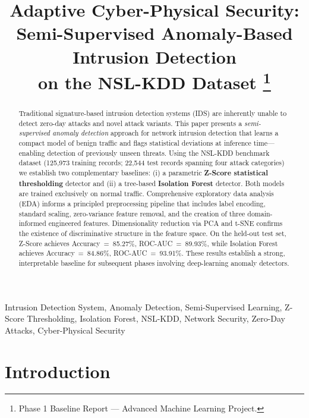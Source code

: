 \documentclass[conference]{IEEEtran}
\begin{document}
\title{%
  Adaptive Cyber-Physical Security:\\
  Semi-Supervised Anomaly-Based Intrusion Detection\\
  on the NSL-KDD Dataset
  \thanks{Phase 1 Baseline Report --- Advanced Machine Learning Project.}
}

\author{%
}

\maketitle

\begin{abstract}
Traditional signature-based intrusion detection systems (IDS) are inherently unable
to detect zero-day attacks and novel attack variants.  This paper presents a
\emph{semi-supervised anomaly detection} approach for network intrusion detection
that learns a compact model of benign traffic and flags statistical deviations at
inference time---enabling detection of previously unseen threats.  Using the
NSL-KDD benchmark dataset (125,973 training records; 22,544 test records spanning
four attack categories) we establish two complementary baselines: (i) a parametric
\textbf{Z-Score statistical thresholding} detector and (ii) a tree-based
\textbf{Isolation Forest} detector.  Both models are trained exclusively on normal
traffic.  Comprehensive exploratory data analysis (EDA) informs a principled
preprocessing pipeline that includes label encoding, standard scaling, zero-variance
feature removal, and the creation of three domain-informed engineered features.
Dimensionality reduction via PCA and t-SNE confirms the existence of discriminative
structure in the feature space.  On the held-out test set, Z-Score achieves
Accuracy~=~85.27\%, ROC-AUC~=~89.93\%, while Isolation Forest achieves
Accuracy~=~84.86\%, ROC-AUC~=~93.91\%.  These results establish a strong, interpretable
baseline for subsequent phases involving deep-learning anomaly detectors.
\end{abstract}

\begin{IEEEkeywords}
Intrusion Detection System, Anomaly Detection, Semi-Supervised Learning,
Z-Score Thresholding, Isolation Forest, NSL-KDD, Network Security,
Zero-Day Attacks, Cyber-Physical Security
\end{IEEEkeywords}

\section{Introduction}
\label{sec:intro}
\end{document}
